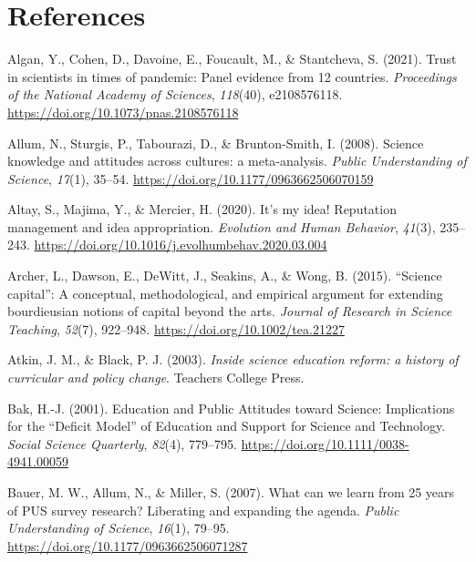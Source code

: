 \documentclass[
  man,
  floatsintext,
  longtable,
  nolmodern,
  notxfonts,
  notimes,
  colorlinks=true,linkcolor=blue,citecolor=blue,urlcolor=blue]{apa7}
\newlength{\cslhangindent}
\newenvironment{CSLReferences}[2] %
 {\begin{list}{}{%
  \setlength{\itemindent}{0pt}
  \setlength{\leftmargin}{0pt}
  \setlength{\parsep}{0pt}
  \ifodd #1
   \setlength{\leftmargin}{\cslhangindent}
   \setlength{\itemindent}{-1\cslhangindent}
  \fi
  \setlength{\itemsep}{#2\baselineskip}}}
 {\end{list}}
\begin{document}
\section{References}\label{references}

\label{refs}
\begin{CSLReferences}{1}{0}
Algan, Y., Cohen, D., Davoine, E., Foucault, M., \& Stantcheva, S.
(2021). Trust in scientists in times of pandemic: Panel evidence from 12
countries. \emph{Proceedings of the National Academy of Sciences},
\emph{118}(40), e2108576118.
\url{https://doi.org/10.1073/pnas.2108576118}

Allum, N., Sturgis, P., Tabourazi, D., \& Brunton-Smith, I. (2008).
Science knowledge and attitudes across cultures: a meta-analysis.
\emph{Public Understanding of Science}, \emph{17}(1), 35--54.
\url{https://doi.org/10.1177/0963662506070159}

Altay, S., Majima, Y., \& Mercier, H. (2020). It's my idea! Reputation
management and idea appropriation. \emph{Evolution and Human Behavior},
\emph{41}(3), 235--243.
\url{https://doi.org/10.1016/j.evolhumbehav.2020.03.004}

Archer, L., Dawson, E., DeWitt, J., Seakins, A., \& Wong, B. (2015).
{``}Science capital{''}: A conceptual, methodological, and empirical
argument for extending bourdieusian notions of capital beyond the arts.
\emph{Journal of Research in Science Teaching}, \emph{52}(7), 922--948.
\url{https://doi.org/10.1002/tea.21227}

Atkin, J. M., \& Black, P. J. (2003). \emph{Inside science education
reform: a history of curricular and policy change}. Teachers College
Press.

Bak, H.-J. (2001). Education and Public Attitudes toward Science:
Implications for the {``}Deficit Model{''} of Education and Support for
Science and Technology. \emph{Social Science Quarterly}, \emph{82}(4),
779--795. \url{https://doi.org/10.1111/0038-4941.00059}

Bauer, M. W., Allum, N., \& Miller, S. (2007). What can we learn from 25
years of PUS survey research? Liberating and expanding the agenda.
\emph{Public Understanding of Science}, \emph{16}(1), 79--95.
\url{https://doi.org/10.1177/0963662506071287}


\end{CSLReferences}
\end{document}
